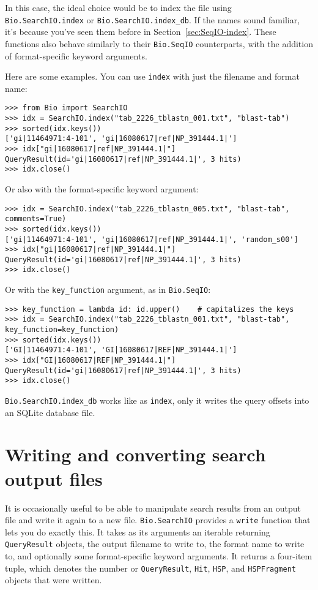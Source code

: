 In this case, the ideal choice would be to index the file using
\verb|Bio.SearchIO.index| or \verb|Bio.SearchIO.index_db|. If the names sound
familiar, it's because you've seen them before in  Section~\ref{sec:SeqIO-index}.
These functions also behave similarly to their \verb|Bio.SeqIO| counterparts,
with the addition of format-specific keyword arguments.

Here are some examples. You can use \verb|index| with just the filename and
format name:

\begin{verbatim}
>>> from Bio import SearchIO
>>> idx = SearchIO.index("tab_2226_tblastn_001.txt", "blast-tab")
>>> sorted(idx.keys())
['gi|11464971:4-101', 'gi|16080617|ref|NP_391444.1|']
>>> idx["gi|16080617|ref|NP_391444.1|"]
QueryResult(id='gi|16080617|ref|NP_391444.1|', 3 hits)
>>> idx.close()
\end{verbatim}

Or also with the format-specific keyword argument:

\begin{verbatim}
>>> idx = SearchIO.index("tab_2226_tblastn_005.txt", "blast-tab", comments=True)
>>> sorted(idx.keys())
['gi|11464971:4-101', 'gi|16080617|ref|NP_391444.1|', 'random_s00']
>>> idx["gi|16080617|ref|NP_391444.1|"]
QueryResult(id='gi|16080617|ref|NP_391444.1|', 3 hits)
>>> idx.close()
\end{verbatim}

Or with the \verb|key_function| argument, as in \verb|Bio.SeqIO|:

\begin{verbatim}
>>> key_function = lambda id: id.upper()    # capitalizes the keys
>>> idx = SearchIO.index("tab_2226_tblastn_001.txt", "blast-tab", key_function=key_function)
>>> sorted(idx.keys())
['GI|11464971:4-101', 'GI|16080617|REF|NP_391444.1|']
>>> idx["GI|16080617|REF|NP_391444.1|"]
QueryResult(id='gi|16080617|ref|NP_391444.1|', 3 hits)
>>> idx.close()
\end{verbatim}

\verb|Bio.SearchIO.index_db| works like as \verb|index|, only it writes the
query offsets into an SQLite database file.

\section{Writing and converting search output files}
\label{sec:searchio-write}

It is occasionally useful to be able to manipulate search results from an output
file and write it again to a new file. \verb|Bio.SearchIO| provides a
\verb|write| function that lets you do exactly this. It takes as its arguments
an iterable returning \verb|QueryResult| objects, the output filename to write
to, the format name to write to, and optionally some format-specific keyword
arguments. It returns a four-item tuple, which denotes the number or
\verb|QueryResult|, \verb|Hit|, \verb|HSP|, and \verb|HSPFragment| objects that
were written.

